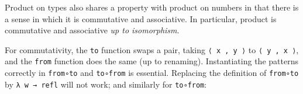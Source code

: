 Product on types also shares a property with product on numbers in that
there is a sense in which it is commutative and associative. In
particular, product is commutative and associative \emph{up to
isomorphism}.

For commutativity, the \texttt{to} function swaps a pair, taking
\texttt{⟨\ x\ ,\ y\ ⟩} to \texttt{⟨\ y\ ,\ x\ ⟩}, and the \texttt{from}
function does the same (up to renaming). Instantiating the patterns
correctly in \texttt{from∘to} and \texttt{to∘from} is essential.
Replacing the definition of \texttt{from∘to} by \texttt{λ\ w\ →\ refl}
will not work; and similarly for \texttt{to∘from}:

\begin{fence}
\begin{code}%
\>[0]\AgdaSpace{}%
\AgdaSymbol{:}\AgdaSpace{}%
\AgdaSpace{}%
\AgdaSymbol{\{}\AgdaSpace{}%
\AgdaSpace{}%
\AgdaSymbol{:}\AgdaSpace{}%
\AgdaSymbol{\}}\AgdaSpace{}%
\AgdaSpace{}%
\AgdaSpace{}%
\AgdaSpace{}%
\AgdaSpace{}%
\AgdaSpace{}%
\AgdaSpace{}%
\AgdaSpace{}%
\<%
\\
\>[0]\AgdaSpace{}%
\AgdaSymbol{=}\<%
\\
\>[0][@{}l@{\AgdaIndent{0}}]%
\>[2]\<%
\\
\>[2][@{}l@{\AgdaIndent{0}}]%
\>[4]\AgdaSymbol{\{}\AgdaSpace{}%
%
\>[15]\AgdaSymbol{=}%
\>[18]\AgdaSpace{}%
\AgdaSpace{}%
\AgdaSpace{}%
\AgdaOperator{\AgdaInductiveConstructor{,}}\AgdaSpace{}%
\AgdaSpace{}%
\AgdaSpace{}%
\AgdaSpace{}%
\AgdaSpace{}%
\AgdaSpace{}%
\AgdaOperator{\AgdaInductiveConstructor{,}}\AgdaSpace{}%
\AgdaSpace{}%
\AgdaSpace{}%
\AgdaSymbol{\}}\<%
\\
%
\>[4]\AgdaSymbol{;}\AgdaSpace{}%
%
\>[15]\AgdaSymbol{=}%
\>[18]\AgdaSpace{}%
\AgdaSpace{}%
\AgdaSpace{}%
\AgdaOperator{\AgdaInductiveConstructor{,}}\AgdaSpace{}%
\AgdaSpace{}%
\AgdaSpace{}%
\AgdaSpace{}%
\AgdaSpace{}%

\end{code}
\end{fence}

